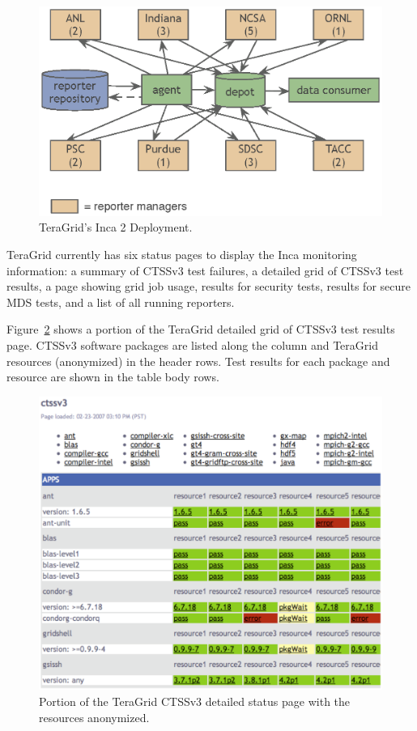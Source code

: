 \documentclass[times,10pt,twocolumn]{article}
\begin{document}
\begin{figure}[hbt]
  \centering
  \includegraphics[scale=0.6]{tg-deploy.eps}
  \caption{TeraGrid's Inca 2 Deployment.}
  \label{tg_deploy_fig}
\end{figure}

TeraGrid currently has six status pages to display the Inca monitoring
information: a summary of CTSSv3 test failures, a detailed grid of CTSSv3 test
results, a page showing grid job
usage, results for security tests, results for secure MDS tests, and a list of
all running reporters.

Figure~\ref{status_page_fig} shows a portion of the TeraGrid detailed grid of
CTSSv3 test results
page.  CTSSv3 software packages are listed along the column and TeraGrid
resources (anonymized) in the header rows.  Test results for each package and
resource are shown in the table body rows.

\begin{figure}[hbt]
  \centering
  \includegraphics[scale=0.4]{status-page.eps}
  \caption{Portion of the TeraGrid CTSSv3 detailed status page with the
  resources anonymized.}
  \label{status_page_fig}
\end{figure}
\end{document}
